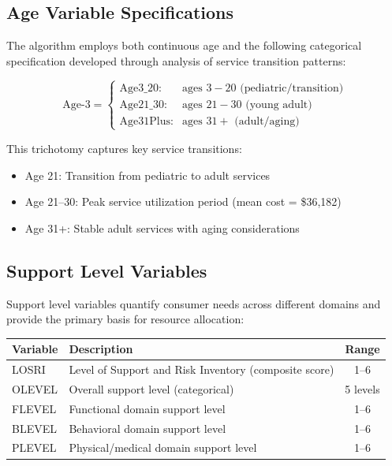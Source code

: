 \subsection{Age Variable Specifications}

The algorithm employs both continuous age and the following categorical specification developed through analysis of service transition patterns:

\begin{equation}
\text{Age-3} = \begin{cases}
\text{Age3\_20}: & \text{ages } 3-20 \text{ (pediatric/transition)} \\
\text{Age21\_30}: & \text{ages } 21-30 \text{ (young adult)} \\
\text{Age31Plus}: & \text{ages } 31+ \text{ (adult/aging)}
\end{cases}
\end{equation}

This trichotomy captures key service transitions:
\begin{itemize}
    \item Age 21: Transition from pediatric to adult services
    \item Age 21--30: Peak service utilization period (mean cost = \$36,182)
    \item Age 31+: Stable adult services with aging considerations
\end{itemize}

\subsection{Support Level Variables}

Support level variables quantify consumer needs across different domains and provide the primary basis for resource allocation:

\begin{center}
\begin{tabular}{|l|p{8cm}|c|}
\hline
\textbf{Variable} & \textbf{Description} & \textbf{Range} \\
\hline
LOSRI & Level of Support and Risk Inventory (composite score) & 1--6 \\
\hline
OLEVEL & Overall support level (categorical) & 5 levels \\
\hline
FLEVEL & Functional domain support level & 1--6 \\
\hline
BLEVEL & Behavioral domain support level & 1--6 \\
\hline
PLEVEL & Physical/medical domain support level & 1--6 \\
\hline
\end{tabular}
\end{center}

